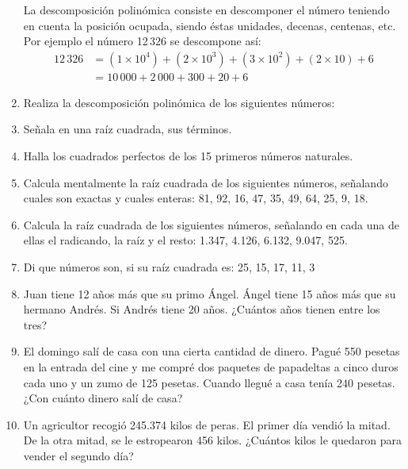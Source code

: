 \documentclass[twoside]{article}
\begin{document}
\begin{enumerate}
\begin{enumerate}
\end{enumerate}
La descomposición polinómica consiste en descomponer el número teniendo en cuenta la posición ocupada, siendo éstas unidades, decenas, centenas, etc.
Por ejemplo el número 12\,326 se descompone así:
\begin{align*}
12\,326&=(1\times 10^{4})+(2\times 10^{3})+(3\times 10^{2})+(2\times 10)+6\\
&=10\,000+2\,000+300+20+6
\end{align*}
\item Realiza la descomposición polinómica de los siguientes números:
\begin{enumerate}
\end{enumerate}
\item Señala en una raíz cuadrada, sus términos.
\item Halla los cuadrados perfectos de los 15 primeros números naturales.
\item Calcula mentalmente la raíz cuadrada de los siguientes números, señalando cuales son exactas y cuales enteras: 81, 92, 16, 47, 35, 49, 64, 25, 9, 18.
\item Calcula la raíz cuadrada de los siguientes números, señalando en cada una de ellas el radicando, la raíz y el resto: 1.347, 4.126, 6.132, 9.047, 525.
\item Di que números son, si su raíz cuadrada es: 25, 15, 17, 11, 3
\item Juan tiene 12 años más que su primo Ángel. Ángel tiene 15 años más que su hermano Andrés. Si Andrés tiene 20 años. ¿Cuántos años tienen entre los tres?
\item El domingo salí de casa con una cierta cantidad de dinero. Pagué 550 pesetas en la entrada del cine y me compré dos paquetes de papadeltas a cinco duros cada uno y un zumo de 125 pesetas. Cuando llegué a casa tenía 240 pesetas. ¿Con cuánto dinero salí de casa?
\item Un agricultor recogió 245.374 kilos de peras. El primer día vendió la mitad. De la otra mitad, se le estropearon 456 kilos. ¿Cuántos kilos le quedaron para vender el segundo día?

\end{enumerate}
\end{document}

